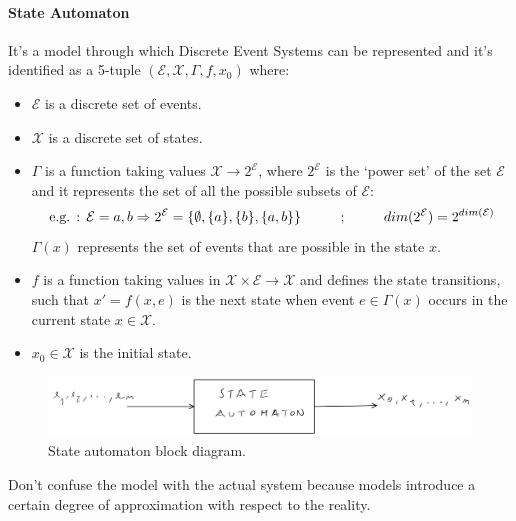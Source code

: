 \documentclass[12pt,a4paper]{article}
\begin{document}
\paragraph{State Automaton} It’s a model through which Discrete Event Systems can be represented and it’s identified as a 5-tuple $(\mathcal{E},\mathcal{X},\Gamma,f,x_0)$ where:
\begin{itemize}
\item $\mathcal{E}$ is a discrete set of events.
\item $\mathcal{X}$ is a discrete set of states.
\item $\Gamma$ is a function taking values $\mathcal{X}\rightarrow 2^\mathcal{E}$, where $2^\mathcal{E}$ is the `power set’ of the set $\mathcal{E}$ and it represents the set of all the possible subsets of $\mathcal{E}$:
$$
\text{e.g. : }\mathcal{E}={a,b} \Rightarrow 2^\mathcal{E}=\{\emptyset, \{a\}, \{b\}, \{a,b\}\} \text{\hspace{1 cm};\hspace{1 cm}} dim(2^\mathcal{E}) = 2^{dim(\mathcal{E})}
$$
$\Gamma(x)$ represents the set of events that are possible in the state $x$. 
\item $f$ is a function taking values in $\mathcal{X}\times\mathcal{E}\rightarrow\mathcal{X}$ and defines the state transitions, such that $x' = f(x,e)$ is the next state when event $e\in\Gamma(x)$ occurs in the current state $x\in\mathcal{X}$.
\item $x_0\in\mathcal{X}$ is the initial state.
\end{itemize}
\begin{figure}[H]
	\centering
	\includegraphics[width=\textwidth]{IMG/stateAut.png}
	\caption{State automaton block diagram.}
	\label{fig:stateAut}
\end{figure}
Don't confuse the model with the actual system because models introduce a certain degree of approximation with respect to the reality.
\end{document}
